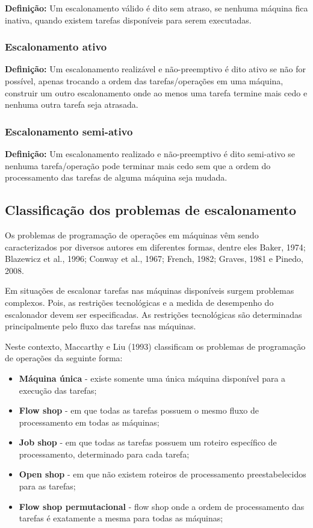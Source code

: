 \textbf{Definição:} Um escalonamento válido é dito sem atraso, se nenhuma máquina fica inativa, quando existem tarefas disponíveis para serem executadas.

\subsubsection{Escalonamento ativo}

\textbf{Definição:} Um escalonamento realizável e não-preemptivo é dito ativo se não for possível, apenas trocando a ordem das tarefas/operações em uma máquina, construir um outro escalonamento onde ao menos uma tarefa termine mais cedo e nenhuma outra tarefa seja atrasada.

\subsubsection{Escalonamento semi-ativo}

\textbf{Definição:} Um escalonamento realizado e não-preemptivo é dito semi-ativo se nenhuma tarefa/operação pode terminar mais cedo sem que a ordem do processamento das tarefas de alguma máquina seja mudada.


\subsection{Classificação dos problemas de escalonamento}
Os problemas de programação de operações em máquinas vêm sendo caracterizados por diversos autores em diferentes formas, dentre eles Baker, 1974; Blazewicz et al., 1996; Conway et al., 1967; French, 1982; Graves, 1981 e Pinedo, 2008.

Em situações de escalonar tarefas nas máquinas disponíveis surgem problemas complexos. Pois, as restrições tecnológicas e a medida de desempenho do escalonador devem ser especificadas. As restrições tecnológicas são determinadas principalmente pelo fluxo das tarefas nas máquinas.

Neste contexto, Maccarthy e Liu (1993) classificam os problemas de programação de operações da seguinte forma:
 
\begin{itemize}
\item \textbf{Máquina única} - existe somente uma única máquina disponível para a execução das tarefas;
\item \textbf{Flow shop} - em que todas as tarefas possuem o mesmo fluxo de processamento em todas as máquinas;
 \item \textbf{Job shop} - em que todas as tarefas possuem um roteiro específico de processamento, determinado para cada tarefa;
 \item \textbf{Open shop} - em que não existem roteiros de processamento preestabelecidos para as tarefas;
 \item \textbf{Flow shop permutacional} - flow shop onde a ordem de processamento das tarefas é exatamente a mesma para todas as máquinas;
\end{itemize}

